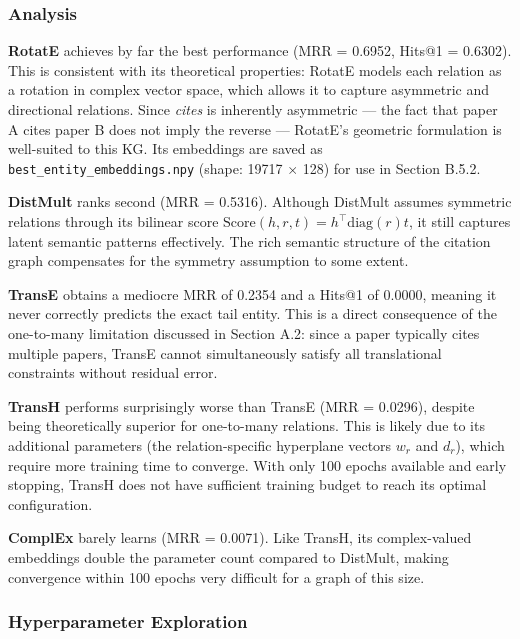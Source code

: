 \documentclass{article}
\begin{document}
  \subsubsection*{Analysis}

  \textbf{RotatE} achieves by far the best performance (MRR = 0.6952, Hits@1 = 0.6302).
  This is consistent with its theoretical properties: RotatE models each relation as
  a rotation in complex vector space, which allows it to capture asymmetric and
  directional relations. Since \textit{cites} is inherently asymmetric --- the fact
  that paper A cites paper B does not imply the reverse --- RotatE's geometric
  formulation is well-suited to this KG. Its embeddings are saved as
  \texttt{best\_entity\_embeddings.npy} (shape: 19717 $\times$ 128) for use in
  Section B.5.2.

  \textbf{DistMult} ranks second (MRR = 0.5316). Although DistMult assumes symmetric
  relations through its bilinear score $\text{Score}(h, r, t) = h^\top \text{diag}(r) t$,
  it still captures latent semantic patterns effectively. The rich semantic structure
  of the citation graph compensates for the symmetry assumption to some extent.

  \textbf{TransE} obtains a mediocre MRR of 0.2354 and a Hits@1 of 0.0000, meaning
  it never correctly predicts the exact tail entity. This is a direct consequence of
  the one-to-many limitation discussed in Section A.2: since a paper typically cites
  multiple papers, TransE cannot simultaneously satisfy all translational constraints
  without residual error.

  \textbf{TransH} performs surprisingly worse than TransE (MRR = 0.0296), despite
  being theoretically superior for one-to-many relations. This is likely due to its
  additional parameters (the relation-specific hyperplane vectors $w_r$ and $d_r$),
  which require more training time to converge. With only 100 epochs available and
  early stopping, TransH does not have sufficient training budget to reach its
  optimal configuration.

  \textbf{ComplEx} barely learns (MRR = 0.0071). Like TransH, its complex-valued
  embeddings double the parameter count compared to DistMult, making convergence
  within 100 epochs very difficult for a graph of this size.

  \subsubsection*{Hyperparameter Exploration}
\end{document}
